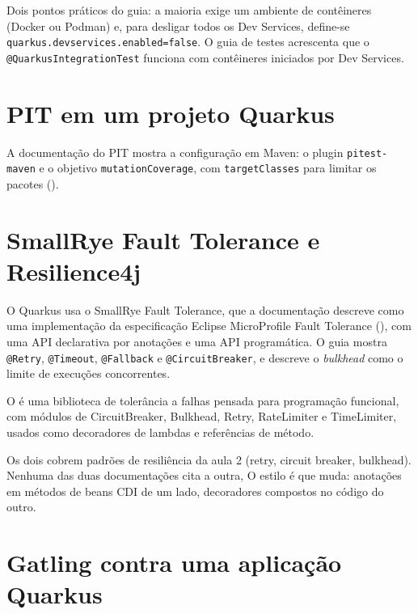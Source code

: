 Dois pontos práticos do guia: a maioria exige um ambiente de contêineres
(Docker ou Podman) e, para desligar todos os Dev Services, define-se
\texttt{quarkus.devservices\allowbreak.enabled=false}. O guia de testes acrescenta que
o \texttt{@QuarkusIntegrationTest} funciona com contêineres iniciados por
Dev Services.

\section{PIT em um projeto Quarkus}

A documentação do PIT mostra a configuração em Maven: o plugin
\texttt{pitest-maven} e o objetivo \texttt{mutationCoverage}, com
\texttt{targetClasses} para limitar os pacotes ().

\section{SmallRye Fault Tolerance e Resilience4j}

O Quarkus usa o SmallRye Fault Tolerance, que a documentação descreve como
uma implementação da especificação Eclipse MicroProfile Fault Tolerance
(), com uma API declarativa por
anotações e uma API programática. O guia
 mostra \texttt{@Retry},
\texttt{@Timeout}, \texttt{@Fallback} e \texttt{@CircuitBreaker}, e descreve
o \emph{bulkhead} como o limite de execuções concorrentes.

O  é uma biblioteca de tolerância a falhas
pensada para programação funcional, com módulos de CircuitBreaker,
Bulkhead, Retry, RateLimiter e TimeLimiter, usados como decoradores de
lambdas e referências de método.

Os dois cobrem padrões de resiliência da aula 2 (retry, circuit breaker,
bulkhead). Nenhuma das duas documentações cita a outra,
 O estilo é que
muda: anotações em métodos de beans CDI de um lado, decoradores
compostos no código do outro.

\section{Gatling contra uma aplicação Quarkus}

